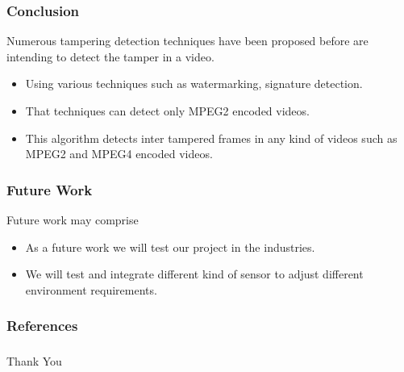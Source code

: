 \documentclass{beamer}
\begin{document}
\begin{frame}\frametitle{Conclusion}
\item Numerous tampering detection techniques have been proposed before are intending to detect the tamper in a video.
\begin{itemize}
    \item Using various techniques such as watermarking, signature detection.
    \item That techniques  can  detect  only  MPEG2  encoded  videos.
\end{itemize}
\begin{itemize}
\item This algorithm detects  inter tampered frames in any kind of videos such as MPEG2 and MPEG4 encoded videos.
\end{itemize}
\end{frame}
\begin{frame}\frametitle{Future Work}
Future work may comprise
\begin{itemize}
\item As a future work we will test our project in the industries.
\item We will test and integrate different kind of sensor to adjust different environment requirements.
\end{itemize}
\end{frame}
\begin{frame}\frametitle{References}
\end{frame}

\begin{frame}\frametitle{}
\Huge
\begin{center}Thank You \end{center}
\end{frame}
\end{document}
